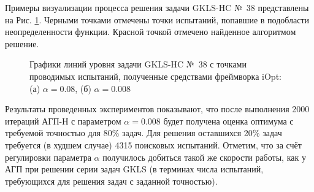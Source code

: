 \documentclass[a4paper,12pt,russian]{article}
\begin{document}

Примеры визуализации процесса решения задачи GKLS-HC №~38 представлены на Рис. \ref{iOpt_result}. Черными точками отмечены точки испытаний, попавшие в подобласти неопределенности функции. Красной точкой отмечено найденное алгоритмом решение.

\begin{figure}[h!]
	\caption{Графики линий уровня задачи GKLS-HC №~38 с точками проводимых испытаний, полученные средствами фреймворка iOpt: (а) $\alpha = 0.08$, (б) $\alpha = 0.008$ }
	\label{iOpt_result}
\end{figure}

Результаты проведенных экспериментов показывают, что после выполнения 2000 итераций АГП-Н с параметром $\alpha = 0.008$ будет получена оценка оптимума с требуемой точностью для 80\% задач. Для решения оставшихся 20\% задач требуется (в худшем случае) 4315 поисковых испытаний. Отметим, что за счёт регулировки параметра $\alpha$ получилось добиться такой же скорости работы, как у  АГП при решении серии задач GKLS (в терминах числа испытаний, требующихся для решения задач с заданной точностью).
\end{document}
